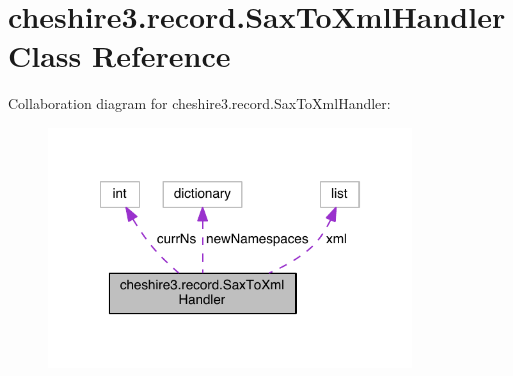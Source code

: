 \hypertarget{classcheshire3_1_1record_1_1_sax_to_xml_handler}{\section{cheshire3.\-record.\-Sax\-To\-Xml\-Handler Class Reference}
\label{classcheshire3_1_1record_1_1_sax_to_xml_handler}
}


Collaboration diagram for cheshire3.\-record.\-Sax\-To\-Xml\-Handler\-:
\nopagebreak
\begin{figure}[H]
\begin{center}
\leavevmode
\includegraphics[width=273pt]{classcheshire3_1_1record_1_1_sax_to_xml_handler__coll__graph}
\end{center}
\end{figure}
